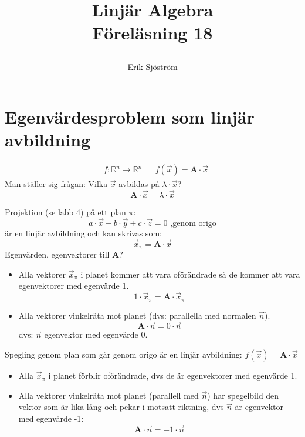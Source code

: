 

\title{
	 Linjär Algebra\\
	 Föreläsning 18
    \author{Erik Sjöström}
}

\maketitle

\section{Egenvärdesproblem som linjär avbildning} %
\label{sec:egenv_rdensproblemet_som_linj_r_avbildning}
\begin{align*}
&f : \mathbb{R}^n \rightarrow \mathbb{R}^n
&&f(\vec{x}) = \mathbf{A} \cdot \vec{x}
\end{align*}
\noindent
Man ställer sig frågan: Vilka $\vec{x}$ avbildas på $\lambda \cdot \vec{x}$?
\[
	\mathbf{A} \cdot \vec{x} = \lambda \cdot \vec{x}
\]
\begin{Ex}
	Projektion (se labb 4) på ett plan $\pi$:
	\[
	a \cdot \vec{x} + b \cdot \vec{y} + c \cdot \vec{z} = 0 \mbox{ ,genom origo}
	\]
	är en linjär avbildning och kan skrivas som:
	\[
	\vec{x}_{\pi} = \mathbf{A} \cdot \vec{x}
	\]
	Egenvärden, egenvektorer till \textbf{A}?
	\begin{itemize}
		\item Alla vektorer $\vec{x}_{\pi}$ i planet kommer att vara oförändrade så de kommer att vara egenvektorer med egenvärde 1.
		\[
		1 \cdot \vec{x}_{\pi} = \mathbf{A} \cdot \vec{x}_{\pi}
		\]
		\item Alla vektorer vinkelräta mot planet (dvs: parallella med normalen $\vec{n}$).
		\[
		\mathbf{A} \cdot \vec{n} = 0 \cdot \vec{n} 
		\]
		dvs: $\vec{n}$ egenvektor med egenvärde 0.  
	\end{itemize}
\end{Ex}
\begin{Ex}
	Spegling genom plan som går genom origo är en linjär avbildning: $f(\vec{x}) = \mathbf{A} \cdot \vec{x}$
	\begin{itemize}
		\item Alla $\vec{x}_{\pi}$ i planet förblir oförändrade, dvs de är egenvektorer med egenvärde 1.
		\item Alla vektorer vinkelräta mot planet (parallell med $\vec{n}$)  har spegelbild den vektor som är lika lång och pekar i motsatt riktning, dvs $\vec{n}$ är egenvektor med egenvärde -1:
		\[
		\mathbf{A} \cdot \vec{n} = -1 \cdot \vec{n}
		\]
	\end{itemize}
\end{Ex}

